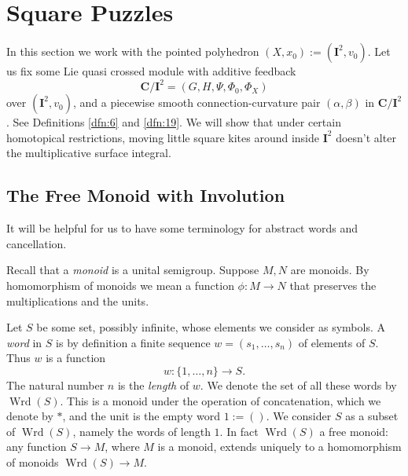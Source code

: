 \documentclass[10pt, a4paper]{amsart}
\theoremstyle{definition}
\numberwithin{equation}{section}
\newcommand{\opn}{\operatorname}
\newcommand{\mbf}[1]{\mathbf{#1}}
\begin{document}
\cleardoublepage
\section{Square Puzzles} \label{sec:puzzles}

In this section we work with  the pointed polyhedron
$(X, x_0) := (\mbf{I}^2, v_0)$. Let us fix some Lie quasi crossed module
with additive feedback 
\[ \mbf{C} / \mbf{I}^2 = (G, H, \Psi, \Phi_0, \Phi_{X}) \]
over $(\mbf{I}^2, v_0)$, and a piecewise smooth connection-curvature pair 
$(\alpha, \beta)$ in $\mbf{C} / \mbf{I}^2$.
See Definitions \ref{dfn:6} and \ref{dfn:19}.
We will show that under certain homotopical restrictions,
moving little square kites around inside $\mbf{I}^2$
doesn't alter the multiplicative surface integral. 


\subsection{The Free Monoid with Involution} \label{subec:freemon}
It will be helpful for us to have some terminology for abstract words and
cancellation. 

Recall that a {\em monoid} is a unital semigroup. Suppose $M, N$ are monoids.
By homomorphism of monoids we mean a function
$\phi : M \to N$ that preserves the multiplications and the units. 

Let $S$ be some set, possibly infinite, whose elements we consider as symbols.
A {\em word} in $S$ is by definition a finite sequence $w = (s_1, \ldots, s_n)$
of elements of $S$. Thus $w$ is a function
\[ w : \{ 1, \ldots, n \} \to S . \] 
The natural number $n$ is the {\em length} of $w$.
We denote the set of all these words by 
$\opn{Wrd}(S)$. This is a monoid under the operation of
concatenation, which we denote by $*$, and the unit is the empty word 
$1 := ()$. We consider $S$ as a subset of $\opn{Wrd}(S)$, namely the words of
length $1$.
In fact $\opn{Wrd}(S)$ a free monoid: any function $S \to M$, where $M$
is a monoid, extends uniquely to a homomorphism of monoids
$\opn{Wrd}(S) \to M$. 
\end{document}
